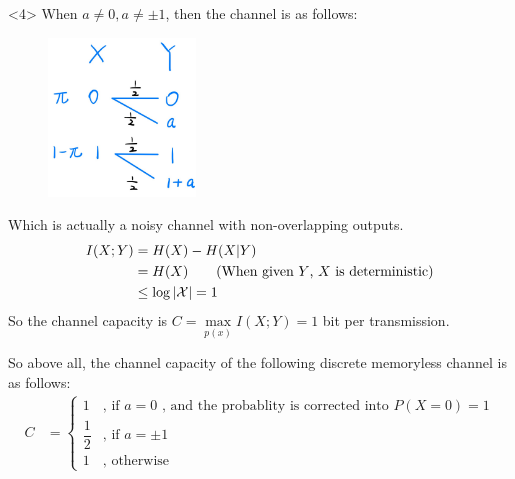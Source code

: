 <4> When $a \neq 0, a \neq \pm 1$, then the channel is as follows:
\begin{figure}[htbp]
    \centering
	\includegraphics[width=0.35\textwidth]{../figures/7.2_otherwise.png}
\end{figure}

Which is actually a noisy channel with non-overlapping outputs.
\begin{align*}
I(X;Y) &= H(X) - H(X|Y) \\
&= H(X) \text{\qquad (When given $Y$, $X$ is deterministic)} \\
&\leq \log \left|\mathcal{X}\right| = 1
\end{align*}
So the channel capacity is $C=\max\limits_{p(x)}I(X;Y)=1$ bit per transmission.

So above all, the channel capacity of the following discrete memoryless channel is as follows:
\begin{align*}
C &= \begin{cases}
1 & \text{, if } a=0 \text{ , and the probablity is corrected into } P(X=0)=1 \\
\dfrac{1}{2} & \text{, if } a=\pm 1 \\
1 & \text{, otherwise}
\end{cases}
\end{align*}

\newpage